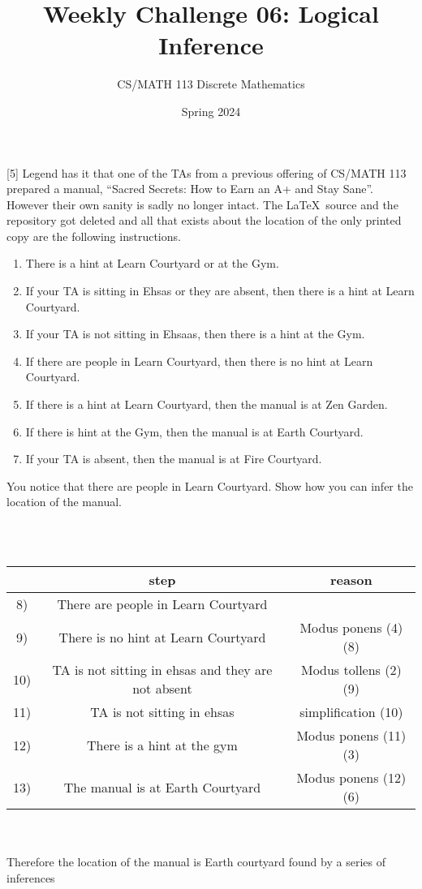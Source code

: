 \documentclass[a4paper]{exam}
\title{Weekly Challenge 06: Logical Inference}
\author{CS/MATH 113 Discrete Mathematics}
\date{Spring 2024}
\begin{document}
\maketitle

\begin{questions}

  [5] Legend has it that one of the TAs from a previous offering of CS/MATH 113 prepared a manual, ``Sacred Secrets: How to Earn an A+ and Stay Sane''. However their own sanity is sadly no longer intact. The \LaTeX\ source and the repository got deleted and all that exists about the location of the only printed copy are the following instructions.
  \begin{enumerate}
  \item There is a hint at Learn Courtyard or at the Gym.
  \item If your TA is sitting in Ehsas or they are absent, then there is a hint at Learn Courtyard.
  \item If your TA is not sitting in Ehsaas, then there is a hint at the Gym.
  \item If there are people in Learn Courtyard, then there is no hint at Learn Courtyard.
  \item If there is a hint at Learn Courtyard, then the manual is at Zen Garden.
  \item If there is hint at the Gym, then the manual is at Earth Courtyard.
  \item If your TA is absent, then the manual is at Fire Courtyard.
  \end{enumerate}
  You notice that there are people in Learn Courtyard. Show how you can infer the location of the manual.

  \begin{solution}\\\\
    \begin{tabular}{|cc|c|}
      \hline
      & step & reason \\ 
      \hline
      8) & There are people in Learn Courtyard & \\
      9) & There is no hint at Learn Courtyard & Modus ponens (4)(8) \\
      10) & TA is not sitting in ehsas and they are not absent & Modus tollens (2)(9)\\
      11) & TA is not sitting in ehsas & simplification (10)\\
      12) & There is a hint at the gym & Modus ponens (11)(3)\\
      13) & The manual is at Earth Courtyard & Modus ponens (12)(6)\\
      \hline
    \end{tabular}\\
    \\Therefore the location of the manual is Earth courtyard found by a series of inferences
  \end{solution}


\end{questions}
\end{document}

